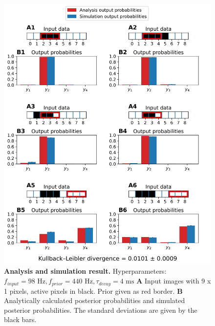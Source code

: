 \begin{figure}
  \includegraphics[width=\linewidth]{figures/1D/1D_98_440_4.png}
    \caption{\textbf{Analysis and simulation result. } Hyperparameters: $f_{input} = 98\text{ Hz}, f_{prior} = 440\text{ Hz}, \tau_{decay} = 4\text{ ms}$ \textbf{A} Input images with 9 x 1 pixels, active pixels in black. Prior given as red border. \textbf{B} Analytically calculated posterior probabilities and simulated posterior probabilities. The standard deviations are given by the black bars.}
  \label{fig:1D_98_440_4}
\end{figure}

